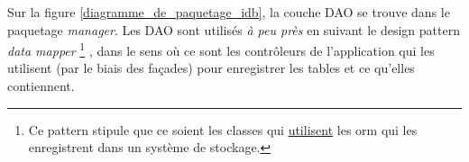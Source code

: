 Sur la figure \ref{diagramme_de_paquetage_idb}, la couche DAO se trouve dans le paquetage \textit{manager}.
Les DAO sont utilisés \textit{à peu près} en suivant le design pattern \textit{data mapper}
\footnote{\label{faux_data_mapper}Ce pattern stipule que ce soient les classes qui \underline{utilisent} les \gls{orm} qui les enregistrent dans un système de stockage.}
, dans le sens où ce sont les contrôleurs de l'application qui les utilisent (par le biais des façades) pour enregistrer les tables et ce qu'elles contiennent.
